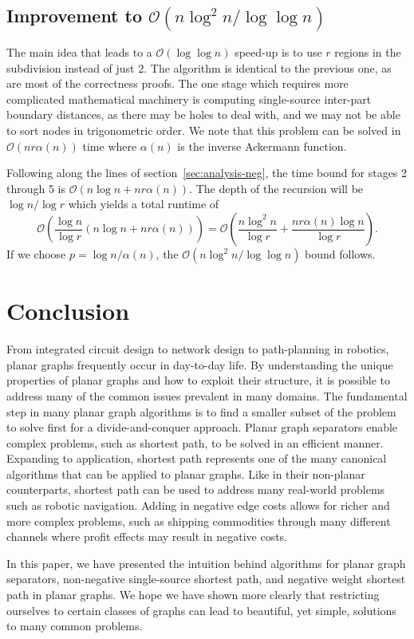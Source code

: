 \documentclass[11pt]{article}
\begin{document}
\subsection{Improvement to $\mathcal{O}(n\log^2 n/\log \log n)$}
\label{sec:impr-mathc-nlog}

The main idea that leads to a $\mathcal{O}(\log \log n)$ speed-up is to use $r$ regions in the subdivision instead of just $2$. The algorithm is identical to the previous one, as are most of the correctness proofs. The one stage which requires more complicated mathematical machinery is computing single-source inter-part boundary distances, as there may be holes to deal with, and we may not be able to sort nodes in trigonometric order. We note that this problem can be solved in $\mathcal{O}(nr\alpha(n))$ time where $\alpha(n)$ is the inverse Ackermann function.

Following along the lines of section~\ref{sec:analysis-neg}, the time bound for stages 2 through 5 is $\mathcal{O}(n \log n + nr \alpha(n))$. The depth of the recursion will be $\log n/ \log r$ which yields a total runtime of
\[
  \mathcal{O}\left(\frac{\log n}{\log r}(n \log n + nr\alpha(n))\right) = \mathcal{O}\left(\frac{n\log^2 n}{\log r} + \frac{nr\alpha(n) \log n}{\log r}\right).
\]
If we choose $p=\log n/\alpha(n)$, the $\mathcal{O}(n\log^2 n/\log \log n)$ bound follows.

\section{Conclusion}
\label{sec:conclusion}

From integrated circuit design to network design to path-planning in robotics, planar graphs frequently occur in day-to-day life. By understanding the unique properties of planar graphs and how to exploit their structure, it is possible to address many of the common issues prevalent in many domains. The fundamental step in many planar graph algorithms is to find a smaller subset of the problem to solve first for a divide-and-conquer approach. Planar graph separators enable complex problems, such as shortest path, to be solved in an efficient manner. Expanding to application, shortest path represents one of the many canonical algorithms that can be applied to planar graphs. Like in their non-planar counterparts, shortest path can be used to address many real-world problems such as robotic navigation. Adding in negative edge costs allows for richer and more complex problems, such as shipping commodities through many different channels where profit effects may result in negative costs.

In this paper, we have presented the intuition behind algorithms for planar graph separators, non-negative single-source shortest path, and negative weight shortest path in planar graphs. We hope we have shown more clearly that restricting ourselves to certain classes of graphs can lead to beautiful, yet simple, solutions to many common problems.



\end{document}
